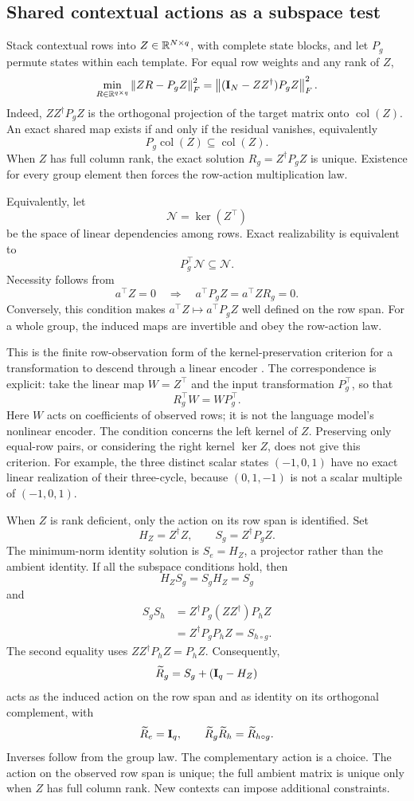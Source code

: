 \subsection{Shared contextual actions as a subspace test}
\label{app:contextual-realization}

Stack contextual rows into $Z\in\mathbb{R}^{N\times q}$, with
complete state blocks, and let $P_g$ permute states within
each template.
For equal row weights and any rank of $Z$,
\[
 \min_{R\in\mathbb{R}^{q\times q}}
 \left\lVert ZR-P_gZ\right\rVert_F^2
 =
 \left\lVert (\mathbf{I}_N-ZZ^\dagger)P_gZ\right\rVert_F^2.
\]
Indeed, $ZZ^\dagger P_gZ$ is the orthogonal projection of
the target matrix onto $\operatorname{col}(Z)$.
An exact shared map exists if and only if the residual
vanishes, equivalently
\[
 P_g\operatorname{col}(Z)
 \subseteq\operatorname{col}(Z).
\]
When $Z$ has full column rank, the exact solution
$R_g=Z^\dagger P_gZ$ is unique.
Existence for every group element then forces the
row-action multiplication law.

Equivalently, let
\[
 \mathcal N=\ker(Z^\top)
\]
be the space of linear dependencies among rows.
Exact realizability is equivalent to
\[
 P_g^\top\mathcal N\subseteq\mathcal N.
\]
Necessity follows from
\[
 a^\top Z=0
 \quad\Longrightarrow\quad
 a^\top P_gZ=a^\top ZR_g=0.
\]
Conversely, this condition makes
$a^\top Z\mapsto a^\top P_gZ$ well defined on the row span.
For a whole group, the induced maps are invertible and
obey the row-action law.

This is the finite row-observation form of the
kernel-preservation criterion for a transformation to
descend through a linear encoder
\citep[Theorem~1]{sun2026transformationlaws}.
The correspondence is explicit: take the linear map
$W=Z^\top$ and the input transformation $P_g^\top$, so that
\[
 R_g^\top W=WP_g^\top.
\]
Here $W$ acts on coefficients of observed rows; it is not
the language model's nonlinear encoder.
The condition concerns the left kernel of $Z$.
Preserving only equal-row pairs, or considering the right
kernel $\ker Z$, does not give this criterion.
For example, the three distinct scalar states
$(-1,0,1)$ have no exact linear realization of their
three-cycle, because $(0,1,-1)$ is not a scalar multiple
of $(-1,0,1)$.

When $Z$ is rank deficient, only the action on its row
span is identified.
Set
\[
 H_Z=Z^\dagger Z,
 \qquad
 S_g=Z^\dagger P_gZ.
\]
The minimum-norm identity solution is $S_e=H_Z$, a
projector rather than the ambient identity.
If all the subspace conditions hold, then
\[
 H_ZS_g=S_gH_Z=S_g
\]
and
\[
 \begin{aligned}
 S_gS_h
 &=Z^\dagger P_g(ZZ^\dagger)P_hZ\\
 &=Z^\dagger P_gP_hZ
 =S_{h\circ g}.
 \end{aligned}
\]
The second equality uses
$ZZ^\dagger P_hZ=P_hZ$.
Consequently,
\[
 \widetilde R_g=S_g+(\mathbf{I}_q-H_Z)
\]
acts as the induced action on the row span and as identity
on its orthogonal complement, with
\[
 \widetilde R_e=\mathbf{I}_q,
 \qquad
 \widetilde R_g\widetilde R_h
 =\widetilde R_{h\circ g}.
\]
Inverses follow from the group law.
The complementary action is a choice.
The action on the observed row span is unique; the full
ambient matrix is unique only when $Z$ has full column
rank.
New contexts can impose additional constraints.

